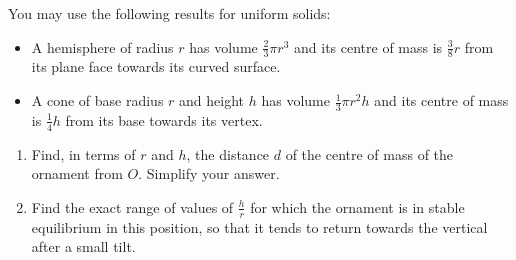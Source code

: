 \documentclass[leqno]{article}
\begin{document}
\begin{enumerate}[
  label=\textbf{\arabic*.},
  leftmargin=*,
  topsep=0pt,
  partopsep=0pt,
  parsep=0pt
]
You may use the following results for uniform solids:
\begin{itemize}[nosep]
\item A hemisphere of radius $r$ has volume $\frac{2}{3}\pi r^3$ and its centre of mass is $\frac38 r$ from its plane face towards its curved surface.
\item A cone of base radius $r$ and height $h$ has volume $\frac{1}{3}\pi r^2h$ and its centre of mass is $\frac14 h$ from its base towards its vertex.
\end{itemize}
\begin{enumerate}[label=\textbf{(\alph*)}]
\item Find, in terms of $r$ and $h$, the distance $d$ of the centre of mass of the ornament from $O$. Simplify your answer.  \\
\item Find the exact range of values of $\frac{h}{r}$ for which the ornament is in stable equilibrium in this position, so that it tends to return towards the vertical after a small tilt.  \\
\end{enumerate}

\end{enumerate}
\end{document}
